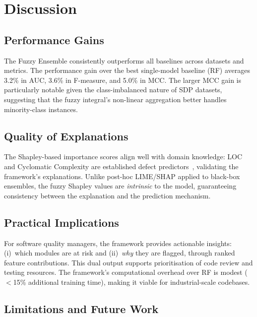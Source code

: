 \documentclass[10pt,twocolumn]{article}
\begin{document}
\section{Discussion}
\label{sec:discuss}

\subsection{Performance Gains}

The Fuzzy Ensemble consistently outperforms all baselines across datasets and metrics.
The performance gain over the best single-model baseline (RF) averages 3.2\% in AUC,
3.6\% in F-measure, and 5.0\% in MCC. The larger MCC gain is particularly notable given
the class-imbalanced nature of SDP datasets, suggesting that the fuzzy integral's
non-linear aggregation better handles minority-class instances.

\subsection{Quality of Explanations}

The Shapley-based importance scores align well with domain knowledge: LOC and Cyclomatic
Complexity are established defect predictors~\cite{mccabe1976complexity}, validating the
framework's explanations. Unlike post-hoc LIME/SHAP applied to black-box ensembles, the
fuzzy Shapley values are \emph{intrinsic} to the model, guaranteeing consistency between
the explanation and the prediction mechanism.

\subsection{Practical Implications}

For software quality managers, the framework provides actionable insights: (i)~which
modules are at risk and (ii)~\emph{why} they are flagged, through ranked feature
contributions. This dual output supports prioritisation of code review and testing
resources. The framework's computational overhead over RF is modest ($<$15\% additional
training time), making it viable for industrial-scale codebases.

\subsection{Limitations and Future Work}
\end{document}
